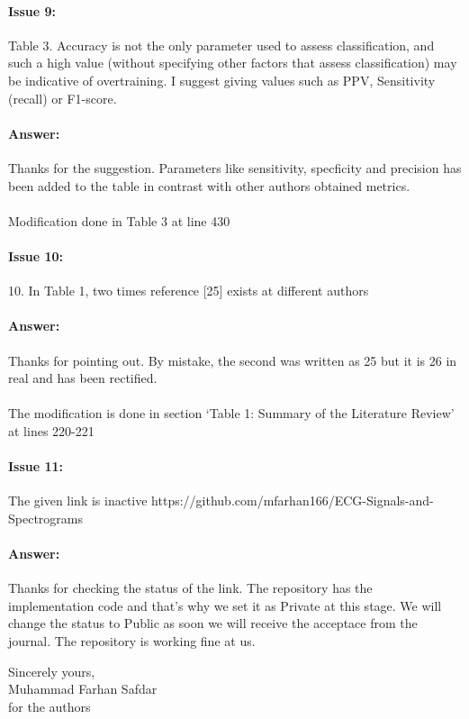 \documentclass{article}
\begin{document}
\paragraph{Issue 9:}
\begin{displayquote}
Table 3. Accuracy is not the only parameter used to assess classification, and such a high value (without specifying other factors that assess classification) may be indicative of overtraining. I suggest giving values such as PPV, Sensitivity (recall) or F1-score.
\end{displayquote}

\paragraph{Answer:}
Thanks for the suggestion. Parameters like sensitivity, specficity and precision has been added to the table in contrast with other authors obtained metrics. \\\\

Modification done in Table 3 at line 430

\paragraph{Issue 10:}
\begin{displayquote}
10. In Table 1, two times reference [25] exists at different authors
\end{displayquote}

\paragraph{Answer:}
Thanks for pointing out. By mistake, the second was written as 25 but it is 26 in real and has been rectified.\\\\

The modification is done in section `Table 1: Summary of the Literature Review' at lines 220-221
\paragraph{Issue 11:}
\begin{displayquote}
The given link is inactive https://github.com/mfarhan166/ECG-Signals-and-Spectrograms
\end{displayquote}

\paragraph{Answer:}
Thanks for checking the status of the link. The repository has the implementation code and that's why we set it as Private at this stage. We will change the status to Public as soon we will receive the acceptace from the journal. The repository is working fine at us.



\vspace{0.25in}

Sincerely yours,\\
Muhammad Farhan Safdar\\
for the authors
\end{document}
